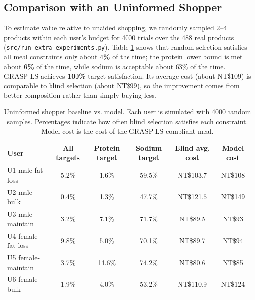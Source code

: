 \documentclass[a4paper]{article}
\begin{document}
\subsection{Comparison with an Uninformed Shopper}\label{sec:human}
To estimate value relative to unaided shopping, we randomly sampled 2--4 products within each user's budget for 4000 trials over the 488 real products (\texttt{src/run\_extra\_experiments.py}). Table \ref{tab:human} shows that random selection satisfies all meal constraints only about \textbf{4\%} of the time; the protein lower bound is met about \textbf{6\%} of the time, while sodium is acceptable about 63\% of the time. GRASP-LS achieves \textbf{100\%} target satisfaction. Its average cost (about NT\$109) is comparable to blind selection (about NT\$99), so the improvement comes from better composition rather than simply buying less.
\begin{table}[htbp]
\centering\normalsize
\caption{Uninformed shopper baseline vs. model. Each user is simulated with 4000 random samples. Percentages indicate how often blind selection satisfies each constraint. Model cost is the cost of the GRASP-LS compliant meal.}
\label{tab:human}
\begin{tabular}{lccccc}
\toprule
User & All targets & Protein target & Sodium target & Blind avg. cost & Model cost \\
\midrule
U1 male-fat loss & 5.2\% & 1.6\%  & 59.5\% & NT\$103.7 & NT\$108 \\
U2 male-bulk     & 0.4\% & 1.3\%  & 47.7\% & NT\$121.6 & NT\$149 \\
U3 male-maintain & 3.2\% & 7.1\%  & 71.7\% & NT\$89.5  & NT\$93  \\
U4 female-fat loss & 9.8\% & 5.0\%  & 70.1\% & NT\$89.7  & NT\$94  \\
U5 female-maintain & 3.7\% & 14.6\% & 74.2\% & NT\$80.6  & NT\$85  \\
U6 female-bulk     & 1.9\% & 4.0\%  & 53.2\% & NT\$110.9 & NT\$124 \\
\bottomrule
\end{tabular}
\end{table}
\end{document}
